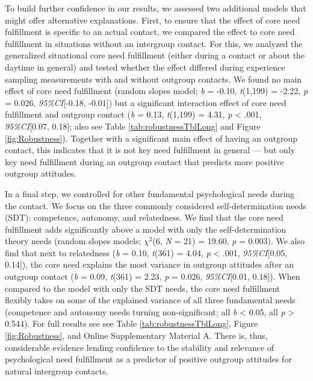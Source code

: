 To build further confidence in our results, we assessed two additional
models that might offer alternative explanations. First, to ensure that
the effect of core need fulfillment is specific to an actual contact, we
compared the effect to core need fulfillment in situations without an
intergroup contact. For this, we analyzed the generalized situational
core need fulfillment (either during a contact or about the daytime in
general) and tested whether the effect differed during experience
sampling measurements with and without outgroup contacts. We found no
main effect of core need fulfillment (random slopes model; \textit{b} =
-0.10, \textit{t}(1,199) = -2.22, \textit{p} = 0.026,
\textit{95\%CI}{[}-0.18, -0.01{]}) but a significant interaction effect
of core need fulfillment and outgroup contact (\textit{b} = 0.13,
\textit{t}(1,199) = 4.31, \textit{p} \textless{} .001,
\textit{95\%CI}{[}0.07, 0.18{]}; also see Table
\ref{tab:robustnessTblLong} and Figure \ref{fig:Robustness}). Together
with a significant main effect of having an outgroup contact, this
indicates that it is not key need fulfillment in general --- but only
key need fulfillment during an outgroup contact that predicts more
positive outgroup attitudes.

In a final step, we controlled for other fundamental psychological needs
during the contact. We focus on the three commonly considered
self-determination needs (SDT): competence, autonomy, and relatedness.
We find that the core need fulfillment adds significantly above a model
with only the self-determination theory needs (random slopes models;
\(\chi^2\)(6, \textit{N} = 21) = 19.60, \textit{p} = 0.003). We also
find that next to relatedness (\textit{b} = 0.10, \textit{t}(361) =
4.04, \textit{p} \textless{} .001, \textit{95\%CI}{[}0.05, 0.14{]}), the
core need explains the most variance in outgroup attitudes after an
outgroup contact (\textit{b} = 0.09, \textit{t}(361) = 2.23, \textit{p}
= 0.026, \textit{95\%CI}{[}0.01, 0.18{]}). When compared to the model
with only the SDT needs, the core need fulfillment flexibly takes on
some of the explained variance of all three fundamental needs
(competence and autonomy needs turning non-significant; all \textit{b}
\textless{} 0.05, all \textit{p} \textgreater{} 0.544). For full results
see see Table \ref{tab:robustnessTblLong}, Figure \ref{fig:Robustness},
and Online Supplementary Material A. There is, thus, considerable
evidence lending confidence to the stability and relevance of
psychological need fulfillment as a predictor of positive outgroup
attitudes for natural intergroup contacts.

